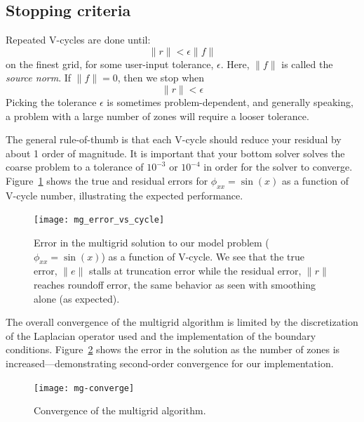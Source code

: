 \subsection{Stopping criteria}

Repeated V-cycles are done until:
\begin{equation}
\| r \| < \epsilon \|f\|
\end{equation}
on the finest grid, for some user-input tolerance, $\epsilon$.  Here,
$\|f\|$ is called the {\em source norm}.  If $\|f\| = 0$, then we stop
when
\begin{equation}
\| r \| < \epsilon 
\end{equation}
Picking the tolerance $\epsilon$ is sometimes problem-dependent, and
generally speaking, a problem with a large number of zones will require
a looser tolerance.

The general rule-of-thumb is that each V-cycle should reduce your
residual by about 1 order of magnitude.  It is important that your
bottom solver solves the coarse problem to a tolerance of $10^{-3}$ or
$10^{-4}$ in order for the solver to converge.  Figure~\ref{fig:mgerror}
shows the true and residual errors for $\phi_{xx} = \sin(x)$ as a function
of V-cycle number, illustrating the expected performance.


\begin{figure}
\centering
\texttt{[image: mg\_error\_vs\_cycle]}
\caption[Error in solution as a function of multigrid V-cycle
  number]{\label{fig:mgerror} Error in the multigrid solution to our
  model problem ($\phi_{xx} = \sin(x)$) as a function of V-cycle.  We
  see that the true error, $\|e\|$ stalls at truncation error while
  the residual error, $\|r\|$ reaches roundoff error, the same
  behavior as seen with smoothing alone (as expected). \\
  }
\end{figure}

The overall convergence of the multigrid algorithm is limited by the
discretization of the Laplacian operator used and the implementation
of the boundary conditions.  Figure~\ref{fig:mg:convergence} shows
the error in the solution as the number of zones is increased---demonstrating
second-order convergence for our implementation.

\begin{figure}[t]
\centering
\texttt{[image: mg-converge]}
\caption[Convergence of the multigrid
  algorithm]{\label{fig:mg:convergence} Convergence of the multigrid
  algorithm. \\ 
  }
\end{figure}


